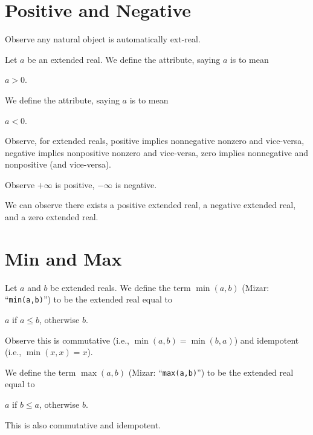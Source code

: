 \documentclass{article}
\begin{document}
\section{Positive and Negative}

Observe any natural object is automatically ext-real.

\begin{definition}
Let $a$ be an extended real.
We define the attribute, saying $a$ is  to mean
\begin{defn}
\item $a>0$.
\end{defn}
We define the attribute, saying $a$ is  to mean
\begin{defn}
\item $a<0$.
\end{defn}
\end{definition}

Observe, for extended reals, positive implies nonnegative nonzero and
vice-versa, negative implies nonpositive nonzero and vice-versa, zero
implies nonnegative and nonpositive (and vice-versa).

Observe $+\infty$ is positive, $-\infty$ is negative.

We can observe there exists a positive extended real, a negative
extended real, and a zero extended real.

\section{Min and Max}

\begin{definition}
Let $a$ and $b$ be extended reals.
We define the term $\min(a,b)$ (Mizar: ``\verb#min(a,b)#'') to be the
extended real equal to
\begin{defn}
\item $a$ if $a\leq b$, otherwise $b$.
\end{defn}
Observe this is commutative (i.e., $\min(a,b)=\min(b,a)$) and idempotent
(i.e., $\min(x,x)=x$).

We define the term $\max(a,b)$ (Mizar: ``\verb#max(a,b)#'') to be the
extended real equal to
\begin{defn}
\item $a$ if $b\leq a$, otherwise $b$.
\end{defn}
This is also commutative and idempotent.
\end{definition}
\end{document}
